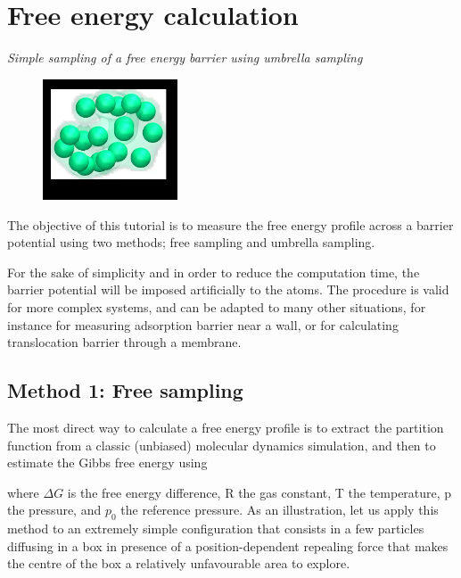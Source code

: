 \chapter{Free energy calculation}
\label{umbrella-sampling-label}

\vspace{-1cm} \noindent \textcolor{graytitle}{\textit{{\Large Simple sampling of a free energy barrier using umbrella sampling}}\vspace{0.5cm} }

\noindent \hspace{-0.45cm}\begin{figure}
\includegraphics[width=4cm]{tutorials/level3/free-energy-calculation/avatar_light.png}
\end{figure}

\noindent The objective of this tutorial is to measure the free
energy profile across a barrier potential using two methods;
free sampling and umbrella sampling.

For the sake of simplicity and in order to reduce the computation time, the
barrier potential will be imposed artificially to the atoms.
The procedure is valid for more complex
systems, and can be adapted to many other situations, for instance 
for measuring adsorption barrier near a wall, or for calculating translocation
barrier through a membrane.

\section{Method 1: Free sampling}

\noindent The most direct way to calculate a free energy profile is to extract
the partition function from a classic (unbiased) molecular
dynamics simulation, and then to estimate the Gibbs free
energy using 

where $\Delta G$ is the free energy difference, R the
gas constant, T the temperature, p the
pressure, and $p_0$ the reference pressure.
As an illustration, let us apply this method to an
extremely simple configuration that consists in a few
particles diffusing in a box in presence of a
position-dependent repealing force that makes the centre
of the box a relatively unfavourable area to explore.

